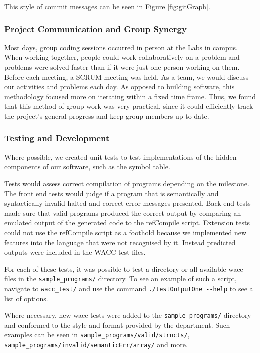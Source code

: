 \documentclass[a4paper,12pt]{article}
\newcommand{\shell}[1]{\lstinline!#1!}
\begin{document}
This style of commit messages can be seen in Figure \ref{fig:gitGraph}. 

\subsubsection*{Project Communication and Group Synergy}

Most days, group coding sessions occurred in person at the Labs in campus. When working together, people could work collaboratively on a problem and problems were solved faster than if it were just one person working on them. Before each meeting, a SCRUM meeting was held. As a team, we would discuss our activities and problems each day. As opposed to building software, this methodology focused more on iterating within a fixed time frame. Thus, we found that this method of group work was very practical, since it could efficiently track the project's general progress and keep group members up to date.

\subsubsection*{Testing and Development}

Where possible, we created unit tests to test implementations of the hidden components of our software, such as the symbol table. 

Tests would assess correct compilation of programs depending on the milestone. The front end tests would judge if a program that is semantically and syntactically invalid halted and correct error messages presented. Back-end tests made sure that valid programs produced the correct output by comparing an emulated output of the generated code to the refCompile script. Extension tests could not use the refCompile script as a foothold because we implemented new features into the language that were not recognised by it. Instead predicted outputs were included in the WACC test files.

For each of these tests, it was possible to test a directory or all available wacc files in the \shell{sample_programs/} directory. To see an example of such a script, navigate to \shell{wacc_test/} and use the command \shell{./testOutputOne --help} to see a list of options.

Where necessary, new wacc tests were added to the \shell{sample_programs/} directory and conformed to the style and format provided by the department. Such examples can be seen in \shell{sample_programs/valid/structs/}, \shell{sample_programs/invalid/semanticErr/array/} and more.
\end{document}
